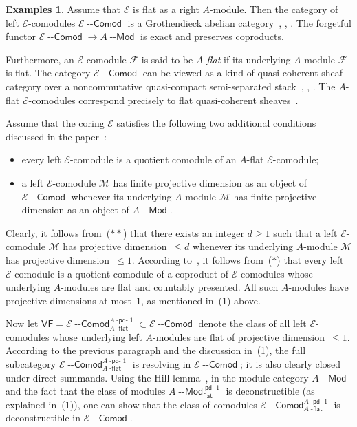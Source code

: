 \documentclass[12pt,a4paper]{amsart}
\newcommand{\+}{\nobreakdash-}
\renewcommand{\:}{\colon}
\newcommand{\rarrow}{\longrightarrow}
\newcommand{\Modl}{{\operatorname{\mathsf{--Mod}}}}
\newcommand{\Comodl}{{\operatorname{\mathsf{--Comod}}}}
\newcommand{\cF}{\mathcal F}
\newcommand{\cE}{\mathcal E}
\newcommand{\cM}{\mathcal M}
\newcommand{\VF}{\mathsf{VF}}
\renewcommand{\flat}{\mathsf{flat}}
\newcommand{\pdo}{{{\operatorname{\mathsf{pd-}}}1}}
\newcommand{\dpdo}{{{\operatorname{\mathsf{-pd-}}}1}}
\newcommand{\dflat}{{\operatorname{\mathsf{-flat}}}}
\theoremstyle{plain}
\theoremstyle{definition}
\newtheorem{exs}[thm]{Examples}
\begin{document}
\begin{exs}
 Assume that $\cE$ is flat as a right $A$\+module.
 Then the category of left $\cE$\+comodules $\cE\Comodl$ is 
a Grothendieck abelian category~\cite[Sections~18.6, 18.14, 18.16,
and~18.23]{BW}, \cite[Proposition~2.12(a)]{Prev},
\cite[Lemma~2.1]{Pflcc}.
 The forgetful functor $\cE\Comodl\rarrow A\Modl$ is exact and
preserves coproducts.

 Furthermore, an $\cE$\+comodule $\cF$ is said to be \emph{$A$\+flat}
if its underlying $A$\+module $\cF$ is flat.
 The category $\cE\Comodl$ can be viewed as a kind of quasi-coherent
sheaf category over a noncommutative quasi-compact semi-separated
stack~\cite[Section~2]{KR}, \cite{KR2}, \cite[Example~2.5]{Pflcc}.
 The $A$\+flat $\cE$\+comodules correspond precisely to flat
quasi-coherent sheaves~\cite[Remark~2.6]{Pflcc}.

 Assume that the coring $\cE$ satisfies the following two additional
conditions discussed in the paper~\cite[Section~5]{Pflcc}:
\begin{itemize}
\item[($*$)] every left $\cE$\+comodule is a quotient comodule of
an $A$\+flat $\cE$\+comodule;
\item[(${*}{*}$)] a left $\cE$\+comodule $\cM$ has finite projective
dimension as an object of $\cE\Comodl$ whenever its underlying
$A$\+module $\cM$ has finite projective dimension as an object of
$A\Modl$.
\end{itemize}

 Clearly, it follows from~(${*}{*}$) that there exists an integer
$d\ge1$ such that a left $\cE$\+comodule $\cM$ has projective
dimension~$\le d$ whenever its underlying $A$\+module $\cM$ has
projective dimension~$\le1$.
 According to~\cite[Theorem~3.1]{Pflcc}, it follows from~(${*}$)
that every left $\cE$\+comodule is a quotient comodule of a coproduct
of $\cE$\+comodules whose underlying $A$\+modules are flat and
countably presented.
 All such $A$\+modules have projective dimensions at most~$1$, as
mentioned in~(1) above.

 Now let $\VF=\cE\Comodl^{A\dpdo}_{A\dflat}\subset\cE\Comodl$ denote
the class of all left $\cE$\+comodules whose underlying left
$A$\+modules are flat of projective dimension~$\le 1$.
 According to the previous paragraph and the discussion in~(1),
the full subcategory $\cE\Comodl^{A\dpdo}_{A\dflat}$ is resolving
in $\cE\Comodl$; it is also clearly closed under direct summands.
 Using the Hill lemma~\cite[Theorem~7.10]{GT},
\cite[Theorem~2.1]{Sto-hill} in the module category $A\Modl$ and
the fact that the class of modules $A\Modl^\pdo_\flat$ is
deconstructible (as explained in~(1)), one can show that the class of
comodules $\cE\Comodl^{A\dpdo}_{A\dflat}$ is deconstructible
in $\cE\Comodl$.


\end{exs}
\end{document}
